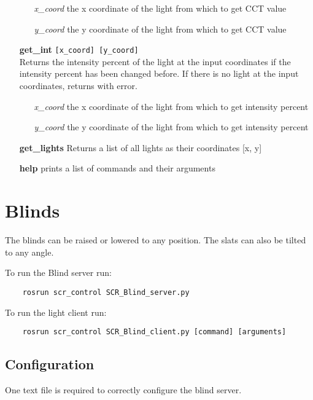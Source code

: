 \documentclass[twoside]{article}
\begin{document}
\begin{enumerate}
		\begin{enumerate}[leftmargin=3\parindent]
			\item[{\it x\_coord}] the x coordinate of the light from which to get CCT value
			\item[{\it y\_coord}] the y coordinate of the light from which to get CCT value
		\end{enumerate}
		
		\item[\bf get\_int] \verb|[x_coord] [y_coord]|\\
		Returns the intensity percent of the light at the input coordinates if the intensity percent has been changed before.
		If there is no light at the input coordinates, returns with error.
		
		\begin{enumerate}[leftmargin=3\parindent]
			\item[{\it x\_coord}] the x coordinate of the light from which to get intensity percent
			\item[{\it y\_coord}] the y coordinate of the light from which to get intensity percent
		\end{enumerate}
	
		\item[\bf get\_lights]
		Returns a list of all lights as their coordinates [x, y]
			
		\item[\bf help] prints a list of commands and their arguments
		
	\end{enumerate}


	
	\section{Blinds}
	The blinds can be raised or lowered to any position. The slats can also be tilted to any angle.
	
	To run the Blind server run:
	\begin{verbatim}
	rosrun scr_control SCR_Blind_server.py
	\end{verbatim}
	
	To run the light client run:
	\begin{verbatim}
	rosrun scr_control SCR_Blind_client.py [command] [arguments]
	\end{verbatim}
	
	\subsection{Configuration}
	One text file is required to correctly configure the blind server.
	
\end{document}
